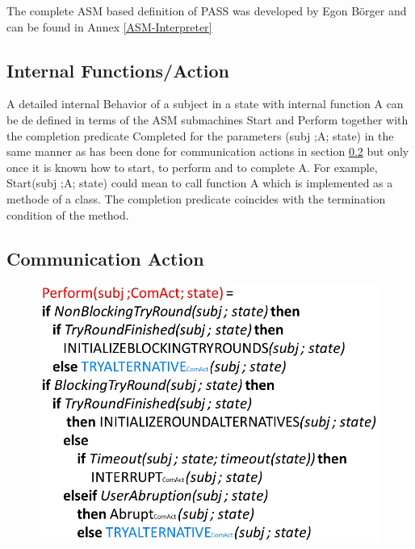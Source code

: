 The complete ASM based definition of PASS was developed by Egon Börger and can be found in Annex \ref{ASM-Interpreter}

\subsection{Internal Functions/Action}

A detailed internal Behavior of a subject in a state with internal function A can
be dedefined in terms of the ASM submachines Start and Perform together with the
completion predicate Completed for the parameters (subj ;A; state) in the same
manner as has been done for communication actions in section \ref{CommunicationAction} but only
once it is known how to start, to perform and to complete A. For example, Start(subj ;A; state) could mean to call function A which is implemented as a methode of a class. The completion
predicate coincides with the termination condition of the method. 




\subsection{Communication Action}
\label{CommunicationAction}

\begin{figure}[ph]
	\centering
	\includegraphics[width=0.7\linewidth]{20181026-Ontologie-Bilder/Grafiken-Ontologie/SUbjectExecution/ASM-perform}
	\caption{}
	\label{fig:asm-perform}
\end{figure}







